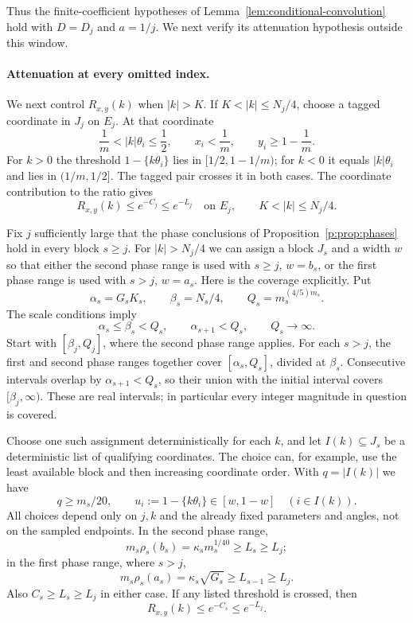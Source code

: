 Thus the finite-coefficient hypotheses of
Lemma~\ref{lem:conditional-convolution} hold with $D=D_j$ and $a=1/j$.
We next verify its attenuation hypothesis outside this window.

\paragraph{Attenuation at every omitted index.}
We next control $R_{x,y}(k)$ when $|k|>K$.  If
$K<|k|\le N_j/4$, choose a tagged coordinate in $J_j$ on $E_j$.
At that coordinate
\[
 \frac1m<|k|\theta_i\le\frac12,
 \qquad x_i<\frac1m,\qquad y_i\ge1-\frac1m.
\]
For $k>0$ the threshold $1-\{k\theta_i\}$ lies in
$[1/2,1-1/m)$; for $k<0$ it equals $|k|\theta_i$ and lies in
$(1/m,1/2]$.  The tagged pair crosses it in both cases.  The
coordinate contribution to the ratio gives
\begin{equation}\label{p:eq:tag-attenuation}
 R_{x,y}(k)\le e^{-C_j}\le e^{-L_j}
 \quad\text{on }E_j,\qquad K<|k|\le N_j/4.
\end{equation}

Fix $j$ sufficiently large that the phase conclusions of
Proposition~\ref{p:prop:phases} hold in every block $s\ge j$.
For $|k|>N_j/4$ we can assign a block $J_s$ and a width $w$ so that
either the second phase range is used with $s\ge j$, $w=b_s$, or
the first phase range is used with $s>j$, $w=a_s$.  Here is the
coverage explicitly.  Put
\[
 \alpha_s=G_sK_s,\qquad \beta_s=N_s/4,
 \qquad Q_s=m_s^{(4/5)m_s}.
\]
The scale conditions imply
\[
 \alpha_s\le\beta_s<Q_s,\qquad \alpha_{s+1}<Q_s,
 \qquad Q_s\longrightarrow\infty.
\]
Start with $[\beta_j,Q_j]$, where the second phase range applies.
For each $s>j$, the first and second phase ranges together cover
$[\alpha_s,Q_s]$, divided at $\beta_s$.  Consecutive intervals
overlap by $\alpha_{s+1}<Q_s$, so their union with the initial
interval covers $[\beta_j,\infty)$.  These are real intervals;
in particular every integer magnitude in question is covered.

Choose one such assignment deterministically for each $k$, and let
$I(k)\subseteq J_s$ be a deterministic list of qualifying
coordinates.  The choice can, for example, use the least available
block and then increasing coordinate order.  With $q=|I(k)|$ we have
\begin{equation}\label{p:eq:tail-thresholds}
 q\ge m_s/20,\qquad
 u_i:=1-\{k\theta_i\}\in[w,1-w]\quad(i\in I(k)).
\end{equation}
All choices depend only on $j,k$ and the already fixed parameters and
angles, not on the sampled endpoints.  In the second phase range,
\[
 m_s\rho_s(b_s)=\kappa_sm_s^{1/40}\ge L_s\ge L_j;
\]
in the first phase range, where $s>j$,
\[
 m_s\rho_s(a_s)=\kappa_s\sqrt{G_s}\ge L_{s-1}\ge L_j.
\]
Also $C_s\ge L_s\ge L_j$ in either case.  If any listed threshold
is crossed, then
\begin{equation}\label{p:eq:tail-crossing-attenuation}
 R_{x,y}(k)\le e^{-C_s}\le e^{-L_j}.
\end{equation}

